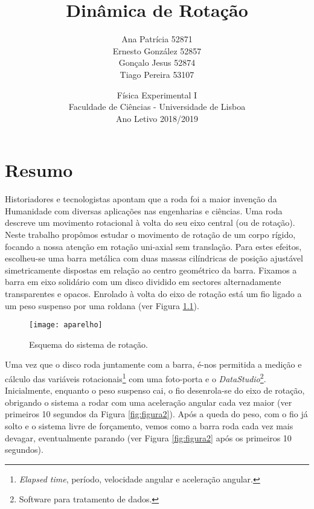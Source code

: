 \documentclass[11pt]{report}
\begin{document}
\title{Dinâmica de Rotação}
\author{Ana Patrícia 52871\\
		Ernesto González 52857\\
		Gonçalo Jesus 52874\\
		Tiago Pereira 53107}
\date{Física Experimental I\\
	  Faculdade de Ciências - Universidade de Lisboa\\
	  Ano Letivo 2018/2019}
\maketitle
\tableofcontents
\chapter{Resumo}
Historiadores e tecnologistas apontam que a roda foi a maior invenção da Humanidade \cite{Bulliet:2016} com diversas aplicações nas engenharias e ciências. Uma roda descreve um movimento rotacional à volta do seu eixo central (ou de rotação). Neste trabalho propômos estudar o movimento de rotação de um corpo rígido, focando a nossa atenção em rotação uni-axial sem translação. Para estes efeitos, escolheu-se uma barra metálica com duas massas cilíndricas de posição ajustável simetricamente dispostas em relação ao centro geométrico da barra. Fixamos a barra em eixo solidário com um disco dividido em sectores alternadamente transparentes e opacos. Enrolado à volta do eixo de rotação está um fio ligado a um peso suspenso por uma roldana (ver Figura \ref{fig:figura1}).

\begin{figure} [h]
\center
\texttt{[image: aparelho]}
\caption{Esquema do sistema de rotação.\label{fig:figura1}}
\end{figure}

\newpage 
Uma vez que o disco roda juntamente com a barra, é-nos permitida a medição e cálculo das variáveis rotacionais\footnote{\textit{Elapsed time}, período, velocidade angular e aceleração angular.} com uma foto-porta e o {\it DataStudio}\footnote{Software para tratamento de dados.}.
Inicialmente, enquanto o peso suspenso cai, o fio desenrola-se do eixo de rotação, obrigando o sistema a rodar com uma aceleração angular cada vez maior (ver primeiros 10 segundos da Figura \ref{fig:figura2}). Após a queda do peso, com o fio já solto e o sistema livre de forçamento, vemos como a barra roda cada vez mais devagar, eventualmente parando (ver Figura \ref{fig:figura2} após os primeiros 10 segundos).
\end{document}
